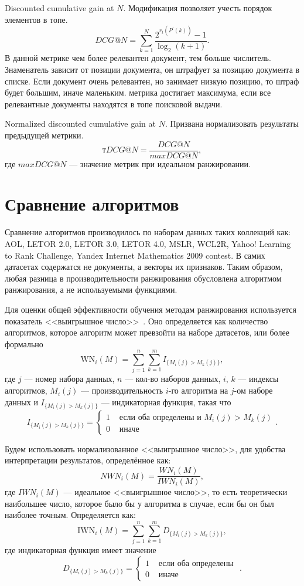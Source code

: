 Discounted cumulative gain at $N$. Модификация позволяет учесть порядок элементов в топе.
\[
D C G @ N=\sum_{k=1}^N \frac{2^{r_t(P^{\prime}(k))}-1}{\log _2(k+1)}.
\]
В данной метрике чем более релевантен документ, тем больше числитель. Знаменатель зависит от позиции документа, он штрафует за позицию документа в списке. Если документ очень релевантен, но занимает низкую позицию, то штраф будет большим, иначе маленьким. метрика достигает максимума, если все релевантные документы находятся в топе поисковой выдачи.

Normalized discounted cumulative gain at $N$. Призвана нормализовать результаты предыдущей метрики.
\[
тD C G @ N=\frac{D C G @ N}{maxD C G @ N},
\]
где $maxD C G @ N$ --- значение метрик при идеальном ранжировании.

\section{Сравнение алгоритмов}

Сравнение алгоритмов производилось по наборам данных таких коллекций как: AOL, LETOR 2.0, LETOR 3.0, LETOR 4.0, MSLR, WCL2R, Yahoo! Learning to Rank Challenge, Yandex Internet Mathematics 2009 contest. В самих датасетах содержатся не документы, а векторы их признаков. Таким образом, любая разница в производительности ранжирования обусловлена алгоритмом ранжирования, а не используемыми функциями.

Для оценки общей эффективности обучения методам ранжирования используется показатель <<выигрышное число>>~\cite{cmp}. Оно определяется как количество алгоритмов, которое алгоритм может превзойти на наборе датасетов, или более формально
\[
\mathrm{WN}_i(M)=\sum_{j=1}^n \sum_{k=1}^m I_{\{M_i(j)>M_k(j)\}},
\]
где $j$ --- номер набора данных, $n$ --- кол-во наборов данных, $i$, $k$ --- индексы алгоритмов, $M_i(j)$ --- производительность $i$-го алгоритма на $j$-ом наборе данных и $I_{\{M_i(j)>M_k(j)\}}$ --- индикаторная функция, такая что
\[
I_{\{M_i(j)>M_k(j)\}}= \begin{cases}1 & \text { если оба определены и } M_i(j)>M_k(j) \\ 0 & \text { иначе }\end{cases}.
\]

Будем использовать нормализованное <<выигрышное число>>, для удобства интерпретации результатов, определённое как:
\[
NWN_i(M)=\frac{WN_i(M)}{IWN_i(M)},
\]
где $IWN_i(M)$ --- идеальное <<выигрышное число>>, то есть теоретически наибольшее число, которое было
бы у алгоритма в случае, если бы он был наиболее точным. Определяется как:
\[
\mathrm{IWN}_i(M)=\sum_{j=1}^n \sum_{k=1}^m D_{\{M_i(j)>M_k(j)\}},
\]
где индикаторная функция имеет значение
\[
D_{\{M_i(j)>M_k(j)\}}= \begin{cases}1 & \text { если оба определены } \\ 0 & \text { иначе }\end{cases}.
\]

